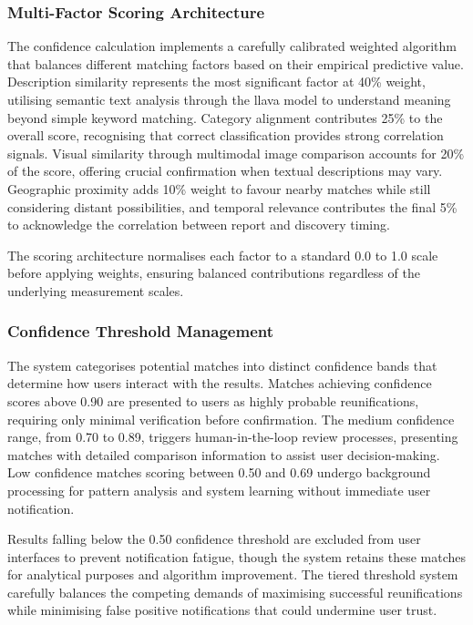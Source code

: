 \subsubsection{Multi-Factor Scoring Architecture}

The confidence calculation implements a carefully calibrated weighted algorithm that balances different matching factors based on their empirical predictive value. Description similarity represents the most significant factor at 40\% weight, utilising semantic text analysis through the \ac{llava} model to understand meaning beyond simple keyword matching. Category alignment contributes 25\% to the overall score, recognising that correct classification provides strong correlation signals. Visual similarity through multimodal image comparison accounts for 20\% of the score, offering crucial confirmation when textual descriptions may vary. Geographic proximity adds 10\% weight to favour nearby matches while still considering distant possibilities, and temporal relevance contributes the final 5\% to acknowledge the correlation between report and discovery timing.

The scoring architecture normalises each factor to a standard 0.0 to 1.0 scale before applying weights, ensuring balanced contributions regardless of the underlying measurement scales.


\subsubsection{Confidence Threshold Management}

The system categorises potential matches into distinct confidence bands that determine how users interact with the results. Matches achieving confidence scores above 0.90 are presented to users as highly probable reunifications, requiring only minimal verification before confirmation. The medium confidence range, from 0.70 to 0.89, triggers human-in-the-loop review processes, presenting matches with detailed comparison information to assist user decision-making. Low confidence matches scoring between 0.50 and 0.69 undergo background processing for pattern analysis and system learning without immediate user notification.

Results falling below the 0.50 confidence threshold are excluded from user interfaces to prevent notification fatigue, though the system retains these matches for analytical purposes and algorithm improvement. The tiered threshold system carefully balances the competing demands of maximising successful reunifications while minimising false positive notifications that could undermine user trust.

